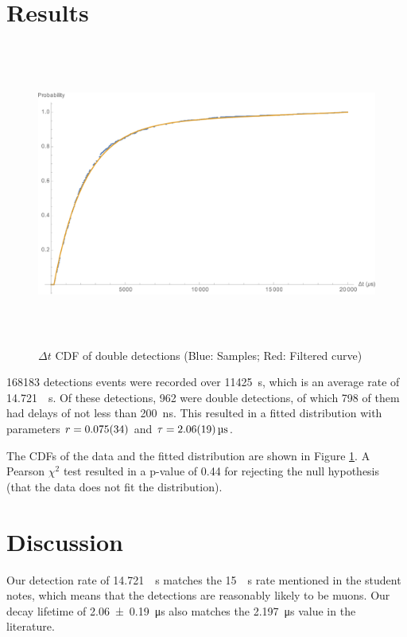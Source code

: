\documentclass[a4paper]{scrartcl}
\begin{document}
\section{Results}
\begin{figure}
    \centering
    \includegraphics[height = 10cm]{cdf.png}
    \caption{ \(\Delta t\) CDF of double detections (Blue: Samples; Red: Filtered curve)}
    \label{fig:cdf}
\end{figure}

\SI{168183}{} detections events were recorded over \SI{11425}{\second}, which is an average rate of \SI{14.721}{\per\second}. Of these detections, 962 were double detections, of which 798 of them had delays of not less than \SI{200}{\nano\second}. This resulted in a fitted distribution with parameters \(r = \SI{0.075 \pm 0.034}{}\) and \(\tau = \SI{2.06 \pm 0.19}{\micro\second}\).

The CDFs of the data and the fitted distribution are shown in Figure \ref{fig:cdf}. A Pearson \(\chi^2\) test resulted in a p-value of 0.44 for rejecting the null hypothesis (that the data does not fit the distribution).

\section{Discussion}
Our detection rate of \SI{14.721}{\per\second} matches the \SI{15}{\per\second} rate mentioned in the student notes, which means that the detections are reasonably likely to be muons. Our decay lifetime of \SI{2.06 \pm 0.19}{\micro\second} also matches the \SI{2.197}{\micro\second} value in the literature\cite{Olive:2016xmw}.
\end{document}
